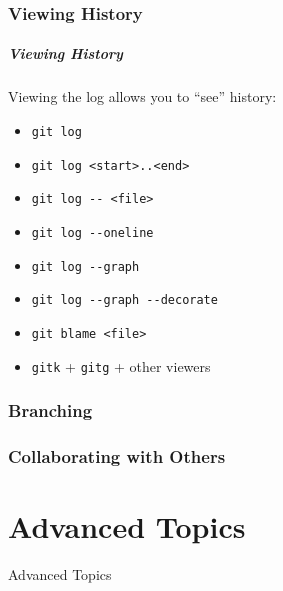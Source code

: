 \documentclass{beamer}
\begin{document}
\section{Viewing History}

\begin{frame}
 \frametitle{Viewing History}

 Viewing the log allows you to ``see'' history:
 \begin{itemize}
  \item \texttt{git log}
  \pause
  \item \texttt{git log \alert{<start>..<end>}}
  \item \texttt{git log \alert{-{}- <file>}}
  \item \texttt{git log \alert{-{}-oneline}}
  \item \texttt{git log \alert{-{}-graph}}
  \item \texttt{git log -{}-graph \alert{-{}-decorate}} \\
 \end{itemize}
 \pause
 \begin{itemize}
  \item \texttt{git blame <file>}
 \end{itemize}
 \pause
 \begin{itemize}
  \item \texttt{gitk} + \texttt{gitg} + other viewers
 \end{itemize}
\end{frame}

\section{Branching}

\section{Collaborating with Others}

\part{Advanced Topics}

\begin{frame}[plain]
 \vfill
 \begin{center}
  \LARGE \color{solarizedAccent} Advanced Topics
 \end{center}
 \vfill
\end{frame}
\end{document}
